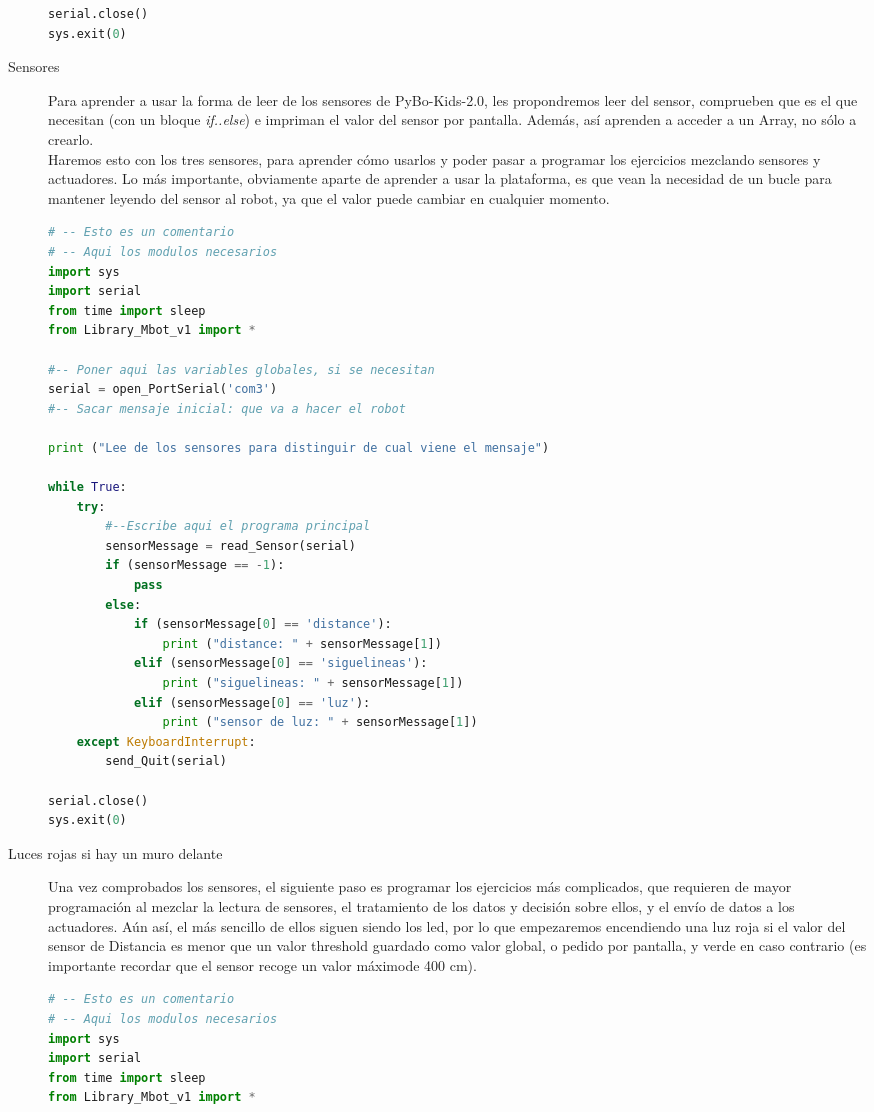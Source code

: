 \begin{description}
\begin{lstlisting}[language=python,caption={Solución de referencia del ejercicio},captionpos=b,tabsize=2]
serial.close()
sys.exit(0)
\end{lstlisting}
	\item [Sensores] Para aprender a usar la forma de leer de los sensores de PyBo-Kids-2.0, les propondremos leer del sensor, comprueben que es el que necesitan (con un bloque \textit{if..else}) e impriman el valor del sensor por pantalla. Además, así aprenden a acceder a un Array, no sólo a crearlo. \\
	Haremos esto con los tres sensores, para aprender cómo usarlos y poder pasar a programar los ejercicios mezclando sensores y actuadores. Lo más importante, obviamente aparte de aprender a usar la plataforma, es que vean la necesidad de un bucle para mantener leyendo del sensor al robot, ya que el valor puede cambiar en cualquier momento.
\begin{lstlisting}[language=python,caption={Solución de referencia del ejercicio},captionpos=b,tabsize=2,tabsize=2]
# -- Esto es un comentario		
# -- Aqui los modulos necesarios
import sys
import serial
from time import sleep
from Library_Mbot_v1 import *

#-- Poner aqui las variables globales, si se necesitan
serial = open_PortSerial('com3')
#-- Sacar mensaje inicial: que va a hacer el robot

print ("Lee de los sensores para distinguir de cual viene el mensaje")

while True:
	try:
		#--Escribe aqui el programa principal
		sensorMessage = read_Sensor(serial)
		if (sensorMessage == -1):
			pass
		else:
			if (sensorMessage[0] == 'distance'):
				print ("distance: " + sensorMessage[1])
			elif (sensorMessage[0] == 'siguelineas'):
				print ("siguelineas: " + sensorMessage[1])
			elif (sensorMessage[0] == 'luz'):
				print ("sensor de luz: " + sensorMessage[1])
	except KeyboardInterrupt:
		send_Quit(serial)

serial.close()
sys.exit(0)
\end{lstlisting}

	\item [Luces rojas si hay un muro delante] Una vez comprobados los sensores, el siguiente paso es programar los ejercicios más complicados, que requieren de mayor programación al mezclar la lectura de sensores, el tratamiento de los datos y decisión sobre ellos, y el envío de datos a los actuadores. Aún así, el más sencillo de ellos siguen siendo los led, por lo que empezaremos encendiendo una luz roja si el valor del sensor de Distancia es menor que un valor threshold guardado como valor global, o pedido por pantalla, y verde en caso contrario (es importante recordar que el sensor recoge un valor máximode 400 cm).
\begin{lstlisting}[language=python,caption={Solución de referencia del ejercicio},captionpos=b,tabsize=2,tabsize=2]
# -- Esto es un comentario		
# -- Aqui los modulos necesarios
import sys
import serial
from time import sleep
from Library_Mbot_v1 import *


\end{lstlisting}
\end{description}

